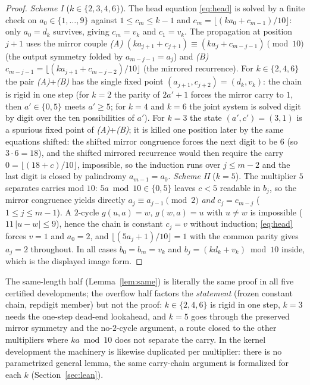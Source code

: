 \begin{proof}
\emph{Scheme I} ($k \in \{2,3,4,6\}$). The head equation
\eqref{eq:head} is solved by a finite check on
$a_0 \in \{1,\dots,9\}$ against $1 \le c_m \le k-1$ and
$c_m = \lfloor(k a_0 + c_{m-1})/10\rfloor$: only
$a_0 = d_k$ survives, giving $c_m = v_k$ and $c_1 = v_k$.
The propagation at position $j+1$ uses the mirror couple
\emph{(A)}
$(k a_{j+1} + c_{j+1}) \equiv (k a_j + c_{m-j-1})
\pmod{10}$ (the output symmetry folded by
$a_{m-j-1} = a_j$) and \emph{(B)}
$c_{m-j-1} = \lfloor(k a_{j+1} + c_{m-j-2})/10\rfloor$
(the mirrored recurrence). For $k \in \{2,4,6\}$ the pair
\emph{(A)}+\emph{(B)} has the single fixed point
$(a_{j+1}, c_{j+2}) = (d_k, v_k)$: the chain is rigid in
one step (for $k = 2$ the parity of $2a'+1$ forces the
mirror carry to $1$, then $a' \in \{0,5\}$ meets
$a' \ge 5$; for $k = 4$ and $k = 6$ the joint system is
solved digit by digit over the ten possibilities of
$a'$). For $k = 3$ the state $(a',c') = (3,1)$ is a
spurious fixed point of \emph{(A)}+\emph{(B)}; it is
killed one position later by the same equations shifted:
the shifted mirror congruence forces the next digit to
be $6$ (so $3 \cdot 6 = 18$), and the shifted mirrored
recurrence would then require the carry
$0 = \lfloor(18 + c)/10\rfloor$, impossible, so the induction runs
over $j \le m-2$ and the last digit is closed by
palindromy $a_{m-1} = a_0$.
\emph{Scheme II} ($k = 5$). The multiplier $5$ separates
carries mod $10$: $5a \bmod 10 \in \{0,5\}$ leaves
$c < 5$ readable in $b_j$, so the mirror congruence
yields directly $a_j \equiv a_{j-1} \pmod 2$ \emph{and}
$c_j = c_{m-j}$ ($1 \le j \le m-1$). A $2$-cycle
$g(u,a) = w$, $g(w,a) = u$ with $u \ne w$ is impossible
($11\,|u-w| \le 9$), hence the chain is constant
$c_j = v$ without induction; \eqref{eq:head} forces
$v = 1$ and $a_0 = 2$, and
$\lfloor(5 a_j + 1)/10\rfloor = 1$ with the common parity
gives $a_j = 2$ throughout. In all cases $b_0 = b_m = v_k$
and $b_j = (k d_k + v_k) \bmod 10$ inside, which is the
displayed image form.
\end{proof}

\begin{remark}
\label{rem:honest}
The same-length half (Lemma~\ref{lem:same}) is literally
the same proof in all five certified developments; the
overflow half factors the \emph{statement} (frozen
constant chain, repdigit member) but not the proof:
$k \in \{2,4,6\}$ is rigid in one step, $k = 3$ needs the
one-step dead-end lookahead, and $k = 5$ goes through the
preserved mirror symmetry and the no-$2$-cycle argument,
a route closed to the other multipliers where
$k a \bmod 10$ does not separate the carry. In the kernel
development the machinery is likewise duplicated per
multiplier: there is no parametrized general lemma, the
same carry-chain argument is formalized for each $k$
(Section~\ref{sec:lean}).
\end{remark}

